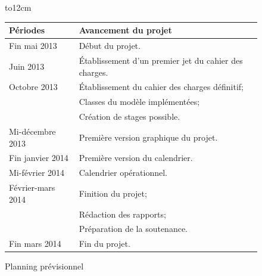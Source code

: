\documentclass[a4paper,10pt]{report}
\begin{document}
    ~\\~\\
    \begin{figure}[H]
	\hbox to12cm{\hss
	\begin{tabular}{|l|l|}
	    \hline
	      \textbf{Périodes} &  \textbf{Avancement du projet}\\
	    \hline
	      Fin mai 2013 & Début du projet.\\
	    \hline
	      Juin 2013 & Établissement d'un premier jet du cahier des charges.\\
	    \hline
	      Octobre 2013 & Établissement du cahier des charges définitif;\\
			  & Classes du modèle implémentées;\\
			  & Création de stages possible.\\
	    \hline
	      Mi-décembre 2013 & Première version graphique du projet.\\
	    \hline
	      Fin janvier 2014 & Première version du calendrier.\\
	    \hline	
	      Mi-février 2014 & Calendrier opérationnel.\\
	    \hline
	      Février-mars 2014 & Finition du projet;\\
				& Rédaction des rapports;\\
				& Préparation de la soutenance.\\
	    \hline
	      Fin mars 2014 & Fin du projet.\\
	    \hline
	\end{tabular}  
      \hss}
      \caption{Planning prévisionnel}
    \end{figure}
      
     
      
\end{document}
